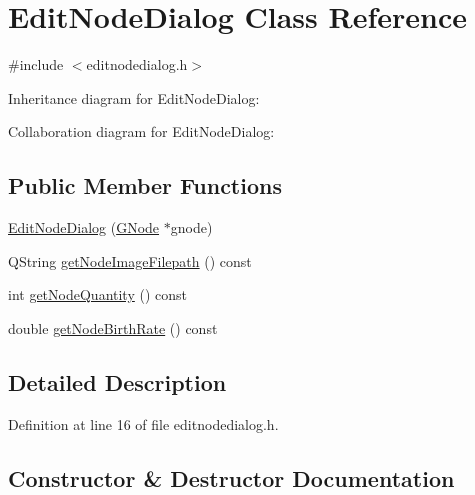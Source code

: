 \hypertarget{class_edit_node_dialog}{}\section{Edit\+Node\+Dialog Class Reference}
\label{class_edit_node_dialog}


{\ttfamily \#include $<$editnodedialog.\+h$>$}



Inheritance diagram for Edit\+Node\+Dialog\+:


Collaboration diagram for Edit\+Node\+Dialog\+:
\subsection*{Public Member Functions}
\begin{DoxyCompactItemize}
\item 
\mbox{\hyperlink{class_edit_node_dialog_ad4521b8c402fe2443755af0b66443de1}{Edit\+Node\+Dialog}} (\mbox{\hyperlink{struct_g_node}{G\+Node}} $\ast$gnode)
\item 
Q\+String \mbox{\hyperlink{class_edit_node_dialog_a332d0500932bcb07e9e2b6bb563f2caf}{get\+Node\+Image\+Filepath}} () const
\item 
int \mbox{\hyperlink{class_edit_node_dialog_aacda0fe9314fb3165cd56394371a1ee4}{get\+Node\+Quantity}} () const
\item 
double \mbox{\hyperlink{class_edit_node_dialog_ab314148e6b30966638e2be8352098ecd}{get\+Node\+Birth\+Rate}} () const
\end{DoxyCompactItemize}


\subsection{Detailed Description}


Definition at line 16 of file editnodedialog.\+h.



\subsection{Constructor \& Destructor Documentation}
\mbox{\label{class_edit_node_dialog_ad4521b8c402fe2443755af0b66443de1}} 
